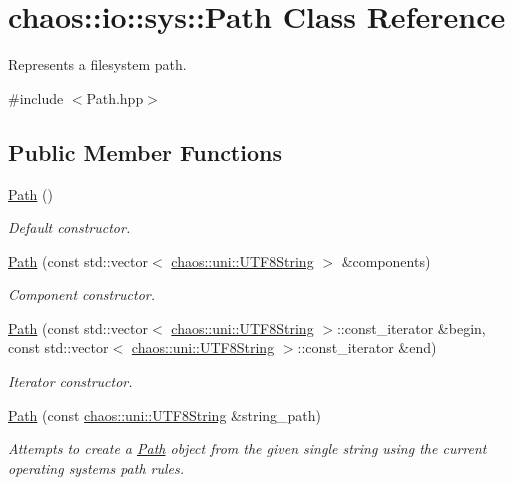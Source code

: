 \hypertarget{classchaos_1_1io_1_1sys_1_1_path}{}\section{chaos\+:\+:io\+:\+:sys\+:\+:Path Class Reference}
\label{classchaos_1_1io_1_1sys_1_1_path}


Represents a filesystem path.  




{\ttfamily \#include $<$Path.\+hpp$>$}

\subsection*{Public Member Functions}
\begin{DoxyCompactItemize}
\item 
\hyperlink{classchaos_1_1io_1_1sys_1_1_path_a4212b2acfcc365769080ea5e915568ee}{Path} ()
\begin{DoxyCompactList}\small\item\em Default constructor. \end{DoxyCompactList}\item 
\hyperlink{classchaos_1_1io_1_1sys_1_1_path_a3647583a07600e50e51d70f1dadabcf5}{Path} (const std\+::vector$<$ \hyperlink{classchaos_1_1uni_1_1_u_t_f8_string}{chaos\+::uni\+::\+U\+T\+F8\+String} $>$ \&components)
\begin{DoxyCompactList}\small\item\em Component constructor. \end{DoxyCompactList}\item 
\hyperlink{classchaos_1_1io_1_1sys_1_1_path_af77a957df51fe41a9c5df2d52ca05585}{Path} (const std\+::vector$<$ \hyperlink{classchaos_1_1uni_1_1_u_t_f8_string}{chaos\+::uni\+::\+U\+T\+F8\+String} $>$\+::const\+\_\+iterator \&begin, const std\+::vector$<$ \hyperlink{classchaos_1_1uni_1_1_u_t_f8_string}{chaos\+::uni\+::\+U\+T\+F8\+String} $>$\+::const\+\_\+iterator \&end)
\begin{DoxyCompactList}\small\item\em Iterator constructor. \end{DoxyCompactList}\item 
\hyperlink{classchaos_1_1io_1_1sys_1_1_path_a1a18b44624caafeceb66edc7b99dbad6}{Path} (const \hyperlink{classchaos_1_1uni_1_1_u_t_f8_string}{chaos\+::uni\+::\+U\+T\+F8\+String} \&string\+\_\+path)
\begin{DoxyCompactList}\small\item\em Attempts to create a \hyperlink{classchaos_1_1io_1_1sys_1_1_path}{Path} object from the given single string using the current operating system\textquotesingle{}s path rules. \end{DoxyCompactList}\item 

\end{DoxyCompactItemize}
